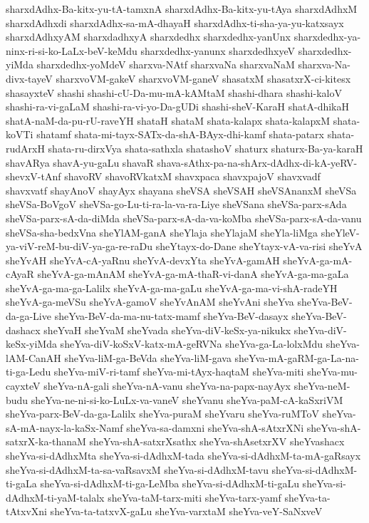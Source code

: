 {sharxdAdhx-Ba-kitx-yu-tA-tamxnA
sharxdAdhx-Ba-kitx-yu-tAya
sharxdAdhxM
sharxdAdhxdi
sharxdAdhx-sa-mA-dhayaH
sharxdAdhx-ti-sha-ya-yu-katxsayx
sharxdAdhxyAM
sharxdadhxyA
sharxdedhx
sharxdedhx-yanUnx
sharxdedhx-ya-ninx-ri-si-ko-LaLx-beV-keMdu
sharxdedhx-yanunx
sharxdedhxyeV
sharxdedhx-yiMda
sharxdedhx-yoMdeV
sharxva-NAtf
sharxvaNa
sharxvaNaM
sharxva-Na-divx-tayeV
sharxvoVM-gakeV
sharxvoVM-ganeV
shasatxM
shasatxrX-ci-kitesx
shasayxteV
shashi
shashi-cU-Da-mu-mA-kAMtaM
shashi-dhara
shashi-kaloV
shashi-ra-vi-gaLaM
shashi-ra-vi-yo-Da-gUDi
shashi-sheV-KaraH
shatA-dhikaH
shatA-naM-da-pu-rU-raveYH
shataH
shataM
shata-kalapx
shata-kalapxM
shata-koVTi
shatamf
shata-mi-tayx-SATx-da-shA-BAyx-dhi-kamf
shata-patarx
shata-rudArxH
shata-ru-dirxVya
shata-sathxla
shatashoV
shaturx
shaturx-Ba-ya-karaH
shavARya
shavA-yu-gaLu
shavaR
shava-sAthx-pa-na-shArx-dAdhx-di-kA-yeRV-shevxV-tAnf
shavoRV
shavoRVkatxM
shavxpaca
shavxpajoV
shavxvadf
shavxvatf
shayAnoV
shayAyx
shayana
sheVSA
sheVSAH
sheVSAnanxM
sheVSa
sheVSa-BoVgoV
sheVSa-go-Lu-ti-ra-la-va-ra-Liye
sheVSana
sheVSa-parx-sAda
sheVSa-parx-sA-da-diMda
sheVSa-parx-sA-da-va-koMba
sheVSa-parx-sA-da-vanu
sheVSa-sha-bedxVna
sheYlAM-ganA
sheYlaja
sheYlajaM
sheYla-liMga
sheYleV-ya-viV-reM-bu-diV-ya-ga-re-raDu
sheYtayx-do-Dane
sheYtayx-vA-va-risi
sheYvA
sheYvAH
sheYvA-cA-yaRnu
sheYvA-devxYta
sheYvA-gamAH
sheYvA-ga-mA-cAyaR
sheYvA-ga-mAnAM
sheYvA-ga-mA-thaR-vi-danA
sheYvA-ga-ma-gaLa
sheYvA-ga-ma-ga-Lalilx
sheYvA-ga-ma-gaLu
sheYvA-ga-ma-vi-shA-radeYH
sheYvA-ga-meVSu
sheYvA-gamoV
sheYvAnAM
sheYvAni
sheYva
sheYva-BeV-da-ga-Live
sheYva-BeV-da-ma-nu-tatx-mamf
sheYva-BeV-dasayx
sheYva-BeV-dashacx
sheYvaH
sheYvaM
sheYvada
sheYva-diV-keSx-ya-nikukx
sheYva-diV-keSx-yiMda
sheYva-diV-koSxV-katx-mA-geRVNa
sheYva-ga-La-lolxMdu
sheYva-lAM-CanAH
sheYva-liM-ga-BeVda
sheYva-liM-gava
sheYva-mA-gaRM-ga-La-na-ti-ga-Ledu
sheYva-miV-ri-tamf
sheYva-mi-tAyx-haqtaM
sheYva-miti
sheYva-mu-cayxteV
sheYva-nA-gali
sheYva-nA-vanu
sheYva-na-papx-nayAyx
sheYva-neM-budu
sheYva-ne-ni-si-ko-LuLx-va-vaneV
sheYvanu
sheYva-paM-cA-kaSxriVM
sheYva-parx-BeV-da-ga-Lalilx
sheYva-puraM
sheYvaru
sheYva-ruMToV
sheYva-sA-mA-nayx-la-kaSx-Namf
sheYva-sa-damxni
sheYva-shA-sAtxrXNi
sheYva-shA-satxrX-ka-thanaM
sheYva-shA-satxrXsathx
sheYva-shAsetxrXV
sheYvashacx
sheYva-si-dAdhxMta
sheYva-si-dAdhxM-tada
sheYva-si-dAdhxM-ta-mA-gaRsayx
sheYva-si-dAdhxM-ta-sa-vaRsavxM
sheYva-si-dAdhxM-tavu
sheYva-si-dAdhxM-ti-gaLa
sheYva-si-dAdhxM-ti-ga-LeMba
sheYva-si-dAdhxM-ti-gaLu
sheYva-si-dAdhxM-ti-yaM-talalx
sheYva-taM-tarx-miti
sheYva-tarx-yamf
sheYva-ta-tAtxvXni
sheYva-ta-tatxvX-gaLu
sheYva-varxtaM
sheYva-veY-SaNxveV
}
